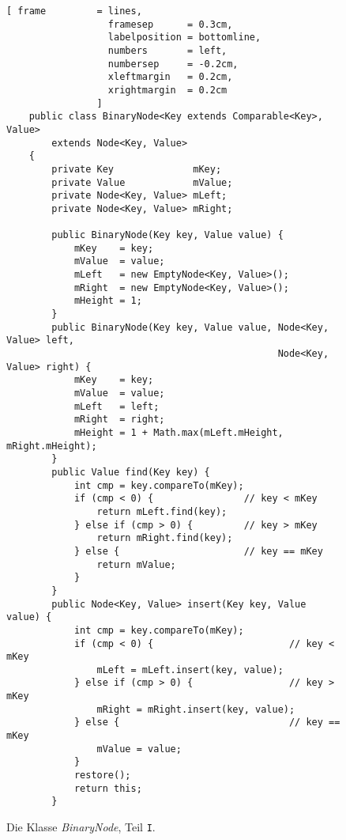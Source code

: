 \begin{figure}[!ht]
  \centering
\begin{Verbatim}[ frame         = lines, 
                  framesep      = 0.3cm, 
                  labelposition = bottomline,
                  numbers       = left,
                  numbersep     = -0.2cm,
                  xleftmargin   = 0.2cm,
                  xrightmargin  = 0.2cm
                ]
    public class BinaryNode<Key extends Comparable<Key>, Value> 
        extends Node<Key, Value>
    {
        private Key              mKey;
        private Value            mValue;
        private Node<Key, Value> mLeft;
        private Node<Key, Value> mRight;
    
        public BinaryNode(Key key, Value value) {
            mKey    = key;
            mValue  = value;
            mLeft   = new EmptyNode<Key, Value>();
            mRight  = new EmptyNode<Key, Value>();
            mHeight = 1;
        }    
        public BinaryNode(Key key, Value value, Node<Key, Value> left, 
                                                Node<Key, Value> right) {
            mKey    = key;
            mValue  = value;
            mLeft   = left;
            mRight  = right;
            mHeight = 1 + Math.max(mLeft.mHeight, mRight.mHeight);
        }
        public Value find(Key key) {
            int cmp = key.compareTo(mKey);
            if (cmp < 0) {                // key < mKey
                return mLeft.find(key);
            } else if (cmp > 0) {         // key > mKey
                return mRight.find(key);
            } else {                      // key == mKey
                return mValue;
            }           
        }
        public Node<Key, Value> insert(Key key, Value value) {
            int cmp = key.compareTo(mKey);
            if (cmp < 0) {                        // key < mKey
                mLeft = mLeft.insert(key, value);
            } else if (cmp > 0) {                 // key > mKey
                mRight = mRight.insert(key, value);
            } else {                              // key == mKey
                mValue = value;
            }
            restore();
            return this;
        }
\end{Verbatim}
\vspace*{-0.3cm}
  \caption{Die Klasse \textsl{BinaryNode}, Teil \texttt{I}.}
  \label{fig:BinaryNode-AVL-I.java}
\end{figure}

